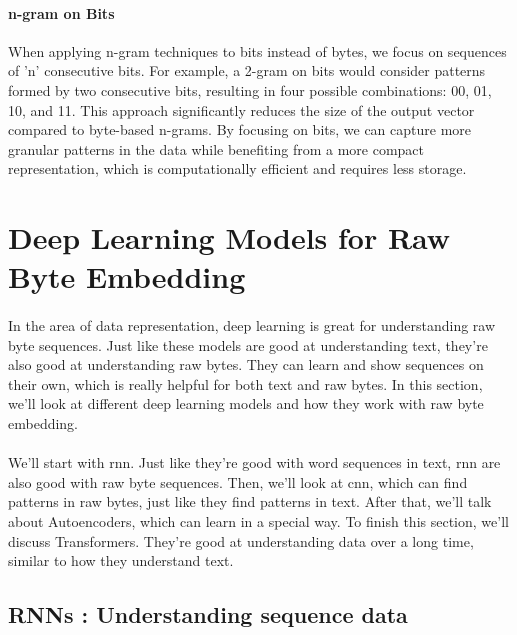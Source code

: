         \paragraph{n-gram on Bits}When applying n-gram techniques to bits instead of bytes, we focus on sequences of 'n' consecutive bits. For example, a 2-gram on bits would consider patterns formed by two consecutive bits, resulting in four possible combinations: 00, 01, 10, and 11. This approach significantly reduces the size of the output vector compared to byte-based n-grams. By focusing on bits, we can capture more granular patterns in the data while benefiting from a more compact representation, which is computationally efficient and requires less storage.

\section{Deep Learning Models for Raw Byte Embedding}\label{seq:background:deep_learning_models_for_raw_byte_embedding}

    \paragraph{}In the area of data representation, deep learning is great for understanding raw byte sequences. Just like these models are good at understanding text, they're also good at understanding raw bytes. They can learn and show sequences on their own, which is really helpful for both text and raw bytes. In this section, we'll look at different deep learning models and how they work with raw byte embedding.

    \paragraph{}We'll start with \acrfull{rnn}. Just like they're good with word sequences in text, \acrfull{rnn} are also good with raw byte sequences. Then, we'll look at \acrfull{cnn}, which can find patterns in raw bytes, just like they find patterns in text. After that, we'll talk about Autoencoders, which can learn in a special way. To finish this section, we'll discuss Transformers. They're good at understanding data over a long time, similar to how they understand text.

    \subsection{RNNs : Understanding sequence data}
